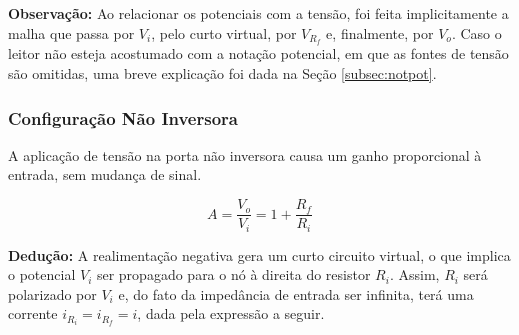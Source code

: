 \documentclass{article}
\numberwithin{equation}{section}
\newcommand{\curtovirtual}{($(opamp.+)+(0.3,0)$) to[open,v^=$ $, l=0, voltage shift=1] ($(opamp.-)+(0.3,0)$)}
\begin{document}
\textbf{Observação:} Ao relacionar os potenciais com a tensão, foi feita implicitamente a malha que passa por $V_i$, pelo curto virtual, por $V_{R_f}$ e, finalmente, por $V_o$. Caso o leitor não esteja acostumado com a notação potencial, em que as fontes de tensão são omitidas, uma breve explicação foi dada na Seção \ref{subsec:notpot}.

\subsubsection{Configuração Não Inversora}
A aplicação de tensão na porta não inversora causa um ganho proporcional à entrada, sem mudança de sinal.

\begin{center}
\end{center}

\begin{equation}
    A=\frac{V_{o}}{V_{i}}=1+\frac{R_{f}}{R_{i}}
\end{equation}

\textbf{Dedução:} A realimentação negativa gera um curto circuito virtual, o que implica o potencial $V_i$ ser propagado para o nó à direita do resistor $R_i$. Assim, $R_i$ será polarizado por $V_i$ e, do fato da impedância de entrada ser infinita, terá uma corrente $i_{R_i} = i_{R_f} = i$, dada pela expressão a seguir.

\begin{center}
\end{center}
\end{document}
